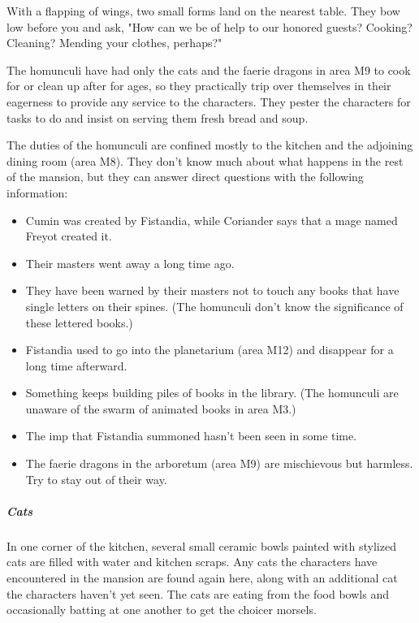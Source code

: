 \documentclass[10pt,a4paper,twoside,bg=print,twocolumn,openany,nodeprecatedcode]{dndbook}
\begin{document}
\begin{DndReadAloud}{}
With a flapping of wings, two small forms land on the nearest table. They bow low before you and ask, "How can we be of help to our honored guests? Cooking? Cleaning? Mending your clothes, perhaps?"

\end{DndReadAloud}

The homunculi have had only the cats and the faerie dragons in area M9 to cook for or clean up after for ages, so they practically trip over themselves in their eagerness to provide any service to the characters. They pester the characters for tasks to do and insist on serving them fresh bread and soup.

The duties of the homunculi are confined mostly to the kitchen and the adjoining dining room (area M8). They don't know much about what happens in the rest of the mansion, but they can answer direct questions with the following information:


\begin{itemize}
\item Cumin was created by Fistandia, while Coriander says that a mage named Freyot created it.
\item Their masters went away a long time ago.
\item They have been warned by their masters not to touch any books that have single letters on their spines. (The homunculi don't know the significance of these lettered books.)
\item Fistandia used to go into the planetarium (area M12) and disappear for a long time afterward.
\item Something keeps building piles of books in the library. (The homunculi are unaware of the swarm of animated books in area M3.)
\item The imp that Fistandia summoned hasn't been seen in some time.
\item The faerie dragons in the arboretum (area M9) are mischievous but harmless. Try to stay out of their way.
\end{itemize}

\subparagraph{Cats}
In one corner of the kitchen, several small ceramic bowls painted with stylized cats are filled with water and kitchen scraps. Any cats the characters have encountered in the mansion are found again here, along with an additional cat the characters haven't yet seen. The cats are eating from the food bowls and occasionally batting at one another to get the choicer morsels.
\end{document}
